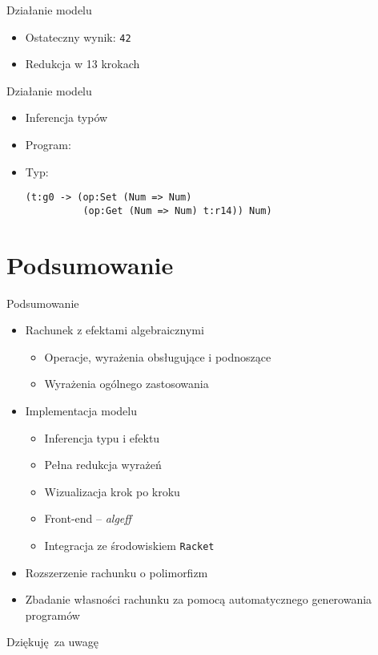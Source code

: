 \documentclass{beamer}
\newcommand{\Racket}{\texttt{Racket}}
\begin{document}
\begin{frame}[fragile]{Działanie modelu}
\begin{itemize}
  \item Ostateczny wynik: \texttt{42}
  \item Redukcja w 13 krokach
\end{itemize}
\end{frame}


\begin{frame}[fragile]{Działanie modelu}
  \begin{itemize}
    \item Inferencja typów
    \pause
    \item Program:
    \pause
    \item Typ:
    \begin{verbatim}
(t:g0 -> (op:Set (Num => Num)
          (op:Get (Num => Num) t:r14)) Num)
    \end{verbatim}
  \end{itemize}
\end{frame}


\section{Podsumowanie}
\begin{frame}{Podsumowanie}
  \begin{itemize}
    \item Rachunek z efektami algebraicznymi
    \begin{itemize}
      \item Operacje, wyrażenia obsługujące i podnoszące
      \item Wyrażenia ogólnego zastosowania
    \end{itemize}
    \pause
    \item Implementacja modelu
    \begin{itemize}
      \item Inferencja typu i efektu
      \item Pełna redukcja wyrażeń
      \item Wizualizacja krok po kroku
      \pause
      \item Front-end -- \emph{algeff}
      \item Integracja ze środowiskiem \Racket{}
    \end{itemize}
    \pause
    \item Rozszerzenie rachunku o polimorfizm
    \pause
    \item Zbadanie własności rachunku za pomocą automatycznego generowania programów
  \end{itemize}
\end{frame}

\begin{frame}
  \centering
  Dziękuję za uwagę
\end{frame}

\begin{frame}
  \titlepage
\end{frame}
\end{document}
